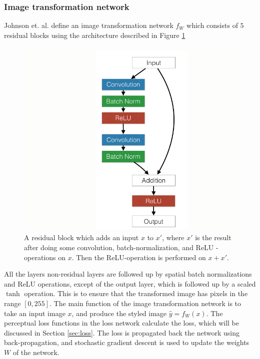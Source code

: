 \subsubsection{Image transformation network}
\label{sec:neuralnetwork}
Johnson et. al. define an image transformation network $f_W$ which consists of $5$ residual blocks using the architecture described in Figure \ref{fig:residual}\newline\newline
\begin{figure}[!ht]
\begin{center}
\includegraphics[scale=0.30]{report/Background/images/residualblock.png}
\caption{A residual block which adds an input $x$ to $x'$, where $x'$ is the result after doing some convolution, batch-normalization, and ReLU - operations on $x$. Then the ReLU-operation is performed on $x+x'.$}
\label{fig:residual}
\end{center}
\end{figure}\newline
All the layers non-residual layers are followed up by spatial batch normalizations and ReLU operations, except of the output layer, which is followed up by a scaled $\tanh$ operation. This is to ensure that the transformed image has pixels in the range $[0, 255].$\newline\newline
The main function of the image transformation network is to take an input image $x$, and produce the styled image $\hat{y}=f_W(x).$ The perceptual loss functions in the loss network calculate the loss, which will be discussed in Section \ref{sec:loss}. The loss is propagated back the network using back-propagation, and stochastic gradient descent is used to update the weights $W$ of the network.
